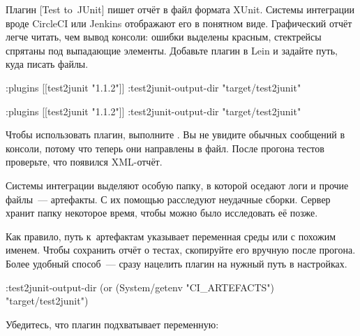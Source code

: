 Плагин [Test to~JUnit]
пишет отчёт в файл формата XUnit. Системы интеграции вроде CircleCI или Jenkins
отображают его в понятном виде. Графический отчёт легче читать, чем вывод
консоли: ошибки выделены красным, стектрейсы спрятаны под выпадающие
элементы. Добавьте плагин в Lein и задайте путь, куда писать файлы.

\ifnarrow

\begin{english}
  \begin{clojure}
:plugins [[test2junit "1.1.2"]]
:test2junit-output-dir
  "target/test2junit"
  \end{clojure}
\end{english}

\else

\begin{english}
  \begin{clojure}
:plugins [[test2junit "1.1.2"]]
:test2junit-output-dir "target/test2junit"
  \end{clojure}
\end{english}

\fi

Чтобы использовать плагин, выполните . Вы не увидите
обычных сообщений в консоли, потому что теперь они направлены в файл. После
прогона тестов проверьте, что появился XML-отчёт.

Системы интеграции выделяют особую папку, в которой оседают логи и прочие
файлы~--- артефакты. С их помощью расследуют неудачные сборки. Сервер хранит
папку некоторое время, чтобы можно было исследовать её позже.

Как правило, путь к~артефактам указывает переменная среды 
или с похожим именем. Чтобы сохранить отчёт о тестах, скопируйте его вручную
после прогона. Более удобный способ~--- сразу нацелить плагин на нужный путь в
настройках.

\begin{english}
  \begin{clojure}
:test2junit-output-dir
  (or (System/getenv "CI_ARTEFACTS")
      "target/test2junit")
  \end{clojure}
\end{english}

\noindent
Убедитесь, что плагин подхватывает переменную:

\ifnarrow

\begin{english}
\end{english}

